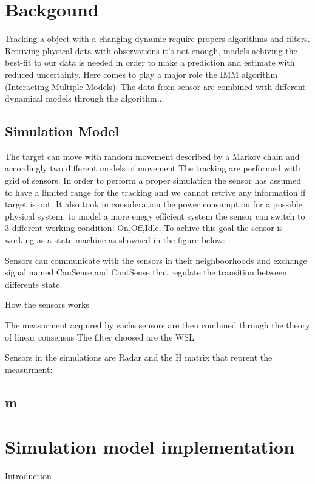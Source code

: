 \documentclass{article}
\begin{document}
\begin{multicols}{2}
    \section*{Backgound}
    \justify
        Tracking a object with a changing dynamic require propers algorithms and filters. Retriving physical data with
        observations it's not enough, models achiving the best-fit to our data is needed in order to make a prediction and estimate 
        with reduced uncertainty. Here comes to play a major role the IMM algorithm (Interacting Multiple Models): The data
        from sensor are combined with different dynamical models through the algorithm... 
        \subsection*{Simulation Model}
            The target can move with random movement described by a Markov chain and accordingly two different models of movement
            The tracking are performed with grid of sensors. In order to perform a proper simulation the sensor has assumed to have a limited
            range for the tracking and we cannot retrive any information if target is out. It also took in consideration the power consumption 
            for a possible physical system: to model a more enegy efficient system the sensor can switch to 3 different working condition: On,Off,Idle.
            To achive this goal the sensor is working as a state machine as showned in the figure below:
            
            Sensors can communicate with the sensors in their neighboorhoods and exchange signal named CanSense and CantSense that regulate the transition
            between differents state. 

            {How the sensors works}

            The measurment acquired by eachs sensors are then combined through the theory of linear consensus
            The filter choosed are the WSL
            
            Sensors in the simulations are Radar and the H matrix that reprent the measurment:

        \subsection*{m}
    
    \section*{Simulation model implementation}
    Introduction

\end{multicols}
\end{document}
